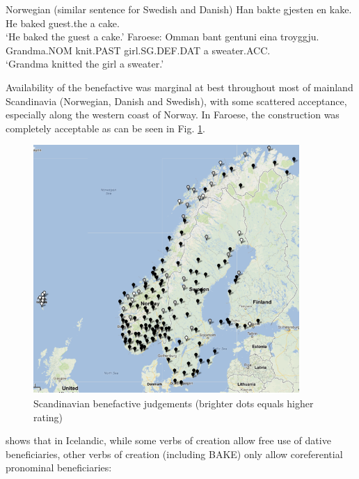 \documentclass[11pt]{upenndiss}
\begin{document}
\begin{exe}
	\ex
	\begin{xlist}
		\ex Norwegian (similar sentence for Swedish and Danish)
		\gll Han bakte gjesten en kake.\\
		He baked guest.the a cake.\\
		\trans `He baked the guest a cake.'
		\ex Faroese:
		\gll Omman bant gentuni eina troyggju.\\
		Grandma.NOM knit.PAST girl.SG.DEF.DAT a sweater.ACC.\\
		\trans `Grandma knitted the girl a sweater.'
	\end{xlist}
\end{exe}

Availability of the benefactive was marginal at best throughout most of mainland Scandinavia (Norwegian, Danish and Swedish), with some scattered acceptance, especially along the western coast of Norway. In Faroese, the construction was completely acceptable as can be seen in Fig. \ref{map:scanbene}.

\begin{figure}
	\centering
	\includegraphics[width=0.9\textwidth]{../images/scanbene1}
	\caption{Scandinavian benefactive judgements (brighter dots equals higher rating)}
	\label{map:scanbene}
\end{figure}

\cite{Thrainsson.2007} shows that in Icelandic, while some verbs of creation allow free use of dative beneficiaries, other verbs of creation (including BAKE) only allow coreferential pronominal beneficiaries:
\end{document}
